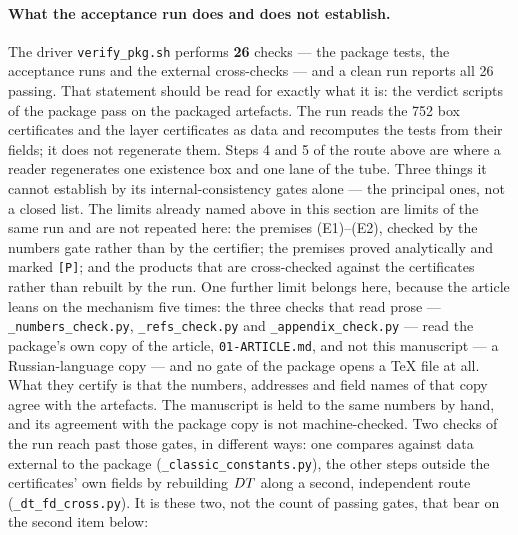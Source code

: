 \paragraph{What the acceptance run does and does not establish.} The driver
\texttt{verify\_\allowbreak pkg.sh} performs \textbf{26} checks --- the package
tests, the acceptance runs and the external cross-checks --- and a clean run
reports all 26 passing. That statement should be read for exactly what it is:
the verdict scripts of the package pass on the packaged artefacts. The run
reads the 752 box certificates and the layer certificates as data and
recomputes the tests from their fields; it does not regenerate them. Steps 4
and 5 of the route above are where a reader regenerates one existence box and
one lane of the tube.
Three things it cannot establish by its internal-consistency gates alone ---
the principal ones, not a closed list. The limits already named above in this
section are limits of the same run and are not repeated here: the premises
(E1)--(E2), checked by the numbers gate rather than by the certifier; the
premises proved analytically and marked \texttt{[P]}; and the products that are
cross-checked against the certificates rather than rebuilt by the run.
One further limit belongs here, because the article leans on the mechanism
five times: the three checks that read prose ---
\texttt{\_\allowbreak numbers\_\allowbreak check.py},
\texttt{\_\allowbreak refs\_\allowbreak check.py} and
\texttt{\_\allowbreak appendix\_\allowbreak check.py} --- read the package's
own copy of the article, \texttt{01-\allowbreak ARTICLE.md}, and not this
manuscript --- a Russian-language copy --- and no gate of the package opens a
\TeX{} file at all. What they
certify is that the numbers, addresses and field names of that copy agree with
the artefacts. The manuscript is held to the same numbers by hand, and its
agreement with the package copy is not machine-checked. Two
checks of the run reach past those gates, in different ways: one compares
against data external to the package
(\texttt{\_\allowbreak classic\_\allowbreak constants.py}), the other steps
outside the certificates' own fields by rebuilding $DT$ along a second,
independent route
(\texttt{\_\allowbreak dt\_\allowbreak fd\_\allowbreak cross.py}). It is these
two, not the count of passing gates, that bear on the second item below:

